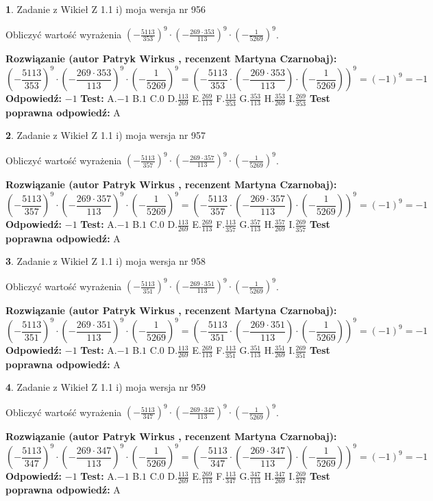 \documentclass[12pt, a4paper]{article}
\theoremstyle{definition} %
\newtheorem{zad}{}
\newcommand{\zadStart}[1]{\begin{zad}#1\newline}
\newcommand{\zadStop}{\end{zad}}
\newcommand{\rozwStart}[2]{\noindent \textbf{Rozwiązanie (autor #1 , recenzent #2): }\newline}
\newcommand{\rozwStop}{\newline}
\newcommand{\odpStart}{\noindent \textbf{Odpowiedź:}\newline}
\newcommand{\odpStop}{\newline}
\newcommand{\testStart}{\noindent \textbf{Test:}\newline}
\newcommand{\testStop}{\newline}
\newcommand{\kluczStart}{\noindent \textbf{Test poprawna odpowiedź:}\newline}
\newcommand{\kluczStop}{\newline}
\begin{document}
\zadStart{Zadanie z Wikieł Z 1.1 i) moja wersja nr 956}

Obliczyć wartość wyrażenia $(-\frac{5113}{353})^{9} \cdot (-\frac{269 \cdot 353}{113})^{9} \cdot (-\frac{1}{5269})^{9}$.
\zadStop
\rozwStart{Patryk Wirkus}{Martyna Czarnobaj}
$$(-\frac{5113}{353})^{9} \cdot (-\frac{269 \cdot 353}{113})^{9} \cdot (-\frac{1}{5269})^{9} = (-\frac{5113}{353} \cdot (-\frac{269 \cdot 353}{113}) \cdot (-\frac{1}{5269}))^{9} = (-1)^{9} = -1$$
\rozwStop
\odpStart
$-1$
\odpStop
\testStart
A.$-1$ B.$1$ C.$0$ D.$\frac{113}{269}$ E.$\frac{269}{113}$
F.$\frac{113}{353}$ G.$\frac{353}{113}$
H.$\frac{353}{269}$
I.$\frac{269}{353}$
\testStop
\kluczStart
A
\kluczStop



\zadStart{Zadanie z Wikieł Z 1.1 i) moja wersja nr 957}

Obliczyć wartość wyrażenia $(-\frac{5113}{357})^{9} \cdot (-\frac{269 \cdot 357}{113})^{9} \cdot (-\frac{1}{5269})^{9}$.
\zadStop
\rozwStart{Patryk Wirkus}{Martyna Czarnobaj}
$$(-\frac{5113}{357})^{9} \cdot (-\frac{269 \cdot 357}{113})^{9} \cdot (-\frac{1}{5269})^{9} = (-\frac{5113}{357} \cdot (-\frac{269 \cdot 357}{113}) \cdot (-\frac{1}{5269}))^{9} = (-1)^{9} = -1$$
\rozwStop
\odpStart
$-1$
\odpStop
\testStart
A.$-1$ B.$1$ C.$0$ D.$\frac{113}{269}$ E.$\frac{269}{113}$
F.$\frac{113}{357}$ G.$\frac{357}{113}$
H.$\frac{357}{269}$
I.$\frac{269}{357}$
\testStop
\kluczStart
A
\kluczStop



\zadStart{Zadanie z Wikieł Z 1.1 i) moja wersja nr 958}

Obliczyć wartość wyrażenia $(-\frac{5113}{351})^{9} \cdot (-\frac{269 \cdot 351}{113})^{9} \cdot (-\frac{1}{5269})^{9}$.
\zadStop
\rozwStart{Patryk Wirkus}{Martyna Czarnobaj}
$$(-\frac{5113}{351})^{9} \cdot (-\frac{269 \cdot 351}{113})^{9} \cdot (-\frac{1}{5269})^{9} = (-\frac{5113}{351} \cdot (-\frac{269 \cdot 351}{113}) \cdot (-\frac{1}{5269}))^{9} = (-1)^{9} = -1$$
\rozwStop
\odpStart
$-1$
\odpStop
\testStart
A.$-1$ B.$1$ C.$0$ D.$\frac{113}{269}$ E.$\frac{269}{113}$
F.$\frac{113}{351}$ G.$\frac{351}{113}$
H.$\frac{351}{269}$
I.$\frac{269}{351}$
\testStop
\kluczStart
A
\kluczStop



\zadStart{Zadanie z Wikieł Z 1.1 i) moja wersja nr 959}

Obliczyć wartość wyrażenia $(-\frac{5113}{347})^{9} \cdot (-\frac{269 \cdot 347}{113})^{9} \cdot (-\frac{1}{5269})^{9}$.
\zadStop
\rozwStart{Patryk Wirkus}{Martyna Czarnobaj}
$$(-\frac{5113}{347})^{9} \cdot (-\frac{269 \cdot 347}{113})^{9} \cdot (-\frac{1}{5269})^{9} = (-\frac{5113}{347} \cdot (-\frac{269 \cdot 347}{113}) \cdot (-\frac{1}{5269}))^{9} = (-1)^{9} = -1$$
\rozwStop
\odpStart
$-1$
\odpStop
\testStart
A.$-1$ B.$1$ C.$0$ D.$\frac{113}{269}$ E.$\frac{269}{113}$
F.$\frac{113}{347}$ G.$\frac{347}{113}$
H.$\frac{347}{269}$
I.$\frac{269}{347}$
\testStop
\kluczStart
A
\kluczStop
\end{document}
